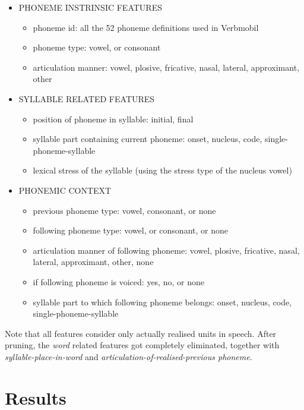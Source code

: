 \documentclass[a4paper]{scrreprt}
\begin{document}
\begin{itemize}
	\item PHONEME INSTRINSIC FEATURES

	\begin{itemize}
		\item phoneme id: all the 52 phoneme definitions used in Verbmobil
		\item phoneme type: vowel, or consonant
		\item articulation manner: vowel, plosive, fricative, nasal, lateral, approximant, other
	\end{itemize}

	\item SYLLABLE RELATED FEATURES

	\begin{itemize}
		\item position of phoneme in syllable: initial, final
		\item syllable part containing current phoneme: onset, nucleus, code, single-phoneme-syllable
		\item lexical stress of the syllable (using the stress type of the nucleus vowel)
	\end{itemize}

	\item PHONEMIC CONTEXT

	\begin{itemize}
		\item previous phoneme type: vowel, consonant, or none
		\item following phoneme type: vowel, or consonant, or none
		\item articulation manner of following phoneme: vowel, plosive, fricative, nasal, lateral, approximant, other, none
		\item if following phoneme is voiced: yes, no, or none
		\item syllable part to which following phoneme belongs: onset, nucleus, code, single-phoneme-syllable
	\end{itemize}
\end{itemize}

Note that all features consider only actually realised units in speech. 
After pruning, the \textit{word} related features got completely eliminated, together with \textit{syllable-place-in-word} and \textit{articulation-of-realised-previous phoneme}. 

\section{Results}
\end{document}
